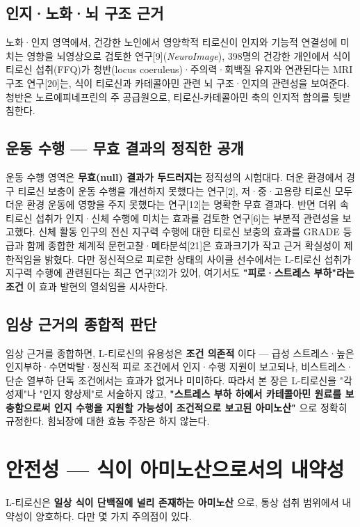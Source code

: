\documentclass[11pt,oneside]{book}
\begin{document}
\subsection{인지·노화·뇌 구조 근거}
노화·인지 영역에서, 건강한 노인에서 영양학적 티로신이 인지와 기능적 연결성에 미치는 영향을 뇌영상으로 검토한 연구[9](\textit{NeuroImage}), 398명의 건강한 개인에서 식이 티로신 섭취(FFQ)가 청반(locus coeruleus)·주의력·회백질 유지와 연관된다는 MRI 구조 연구[20]는, 식이 티로신과 카테콜아민 관련 뇌 구조·인지의 관련성을 보여준다. 청반은 노르에피네프린의 주 공급원으로, 티로신-카테콜아민 축의 인지적 함의를 뒷받침한다.

\subsection{운동 수행 — 무효 결과의 정직한 공개}
운동 수행 영역은 \textbf{무효(null) 결과가 두드러지는} 정직성의 시험대다. 더운 환경에서 경구 티로신 보충이 운동 수행을 개선하지 못했다는 연구[2], 저·중·고용량 티로신 모두 더운 환경 운동에 영향을 주지 못했다는 연구[12]는 명확한 무효 결과다. 반면 더위 속 티로신 섭취가 인지·신체 수행에 미치는 효과를 검토한 연구[6]는 부분적 관련성을 보고했다. 신체 활동 인구의 전신 지구력 수행에 대한 티로신 보충의 효과를 GRADE 등급과 함께 종합한 체계적 문헌고찰·메타분석[21]은 효과크기가 작고 근거 확실성이 제한적임을 밝혔다. 다만 정신적으로 피로한 상태의 사이클 선수에서는 L-티로신 섭취가 지구력 수행에 관련된다는 최근 연구[32]가 있어, 여기서도 \textbf{"피로·스트레스 부하"라는 조건} 이 효과 발현의 열쇠임을 시사한다.

\subsection{임상 근거의 종합적 판단}
임상 근거를 종합하면, L-티로신의 유용성은 \textbf{조건 의존적} 이다 — 급성 스트레스·높은 인지부하·수면박탈·정신적 피로 조건에서 인지·수행 지원이 보고되나, 비스트레스·단순 열부하 단독 조건에서는 효과가 없거나 미미하다. 따라서 본 장은 L-티로신을 "각성제"나 "인지 향상제"로 서술하지 않고, \textbf{"스트레스 부하 하에서 카테콜아민 원료를 보충함으로써 인지 수행을 지원할 가능성이 조건적으로 보고된 아미노산"} 으로 정확히 규정한다. 힘뇌장에 대한 효능 주장은 하지 않는다.

\section{안전성 — 식이 아미노산으로서의 내약성}
L-티로신은 \textbf{일상 식이 단백질에 널리 존재하는 아미노산} 으로, 통상 섭취 범위에서 내약성이 양호하다. 다만 몇 가지 주의점이 있다.
\end{document}

